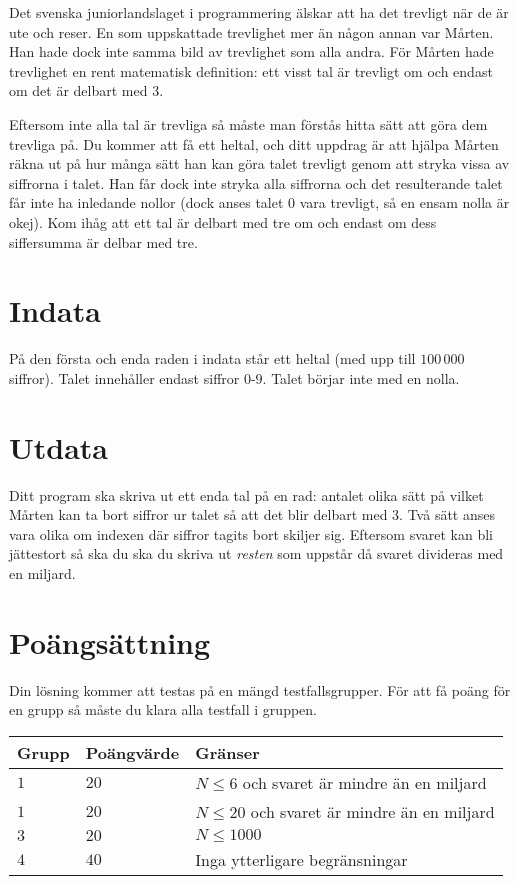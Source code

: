 Det svenska juniorlandslaget i programmering älskar att ha det trevligt när de
är ute och reser. En som uppskattade trevlighet mer än någon annan var Mårten.
Han hade dock inte samma bild av trevlighet som alla andra. För Mårten hade
trevlighet en rent matematisk definition: ett visst tal är trevligt om och
endast om det är delbart med 3.

Eftersom inte alla tal är trevliga så måste man förstås hitta sätt att göra dem
trevliga på. Du kommer att få ett heltal, och ditt uppdrag är att hjälpa Mårten
räkna ut på hur många sätt han kan göra talet trevligt genom att stryka vissa av
siffrorna i talet. Han får dock inte stryka alla siffrorna och det resulterande
talet får inte ha inledande nollor (dock anses talet $0$ vara trevligt, så en
ensam nolla är okej). Kom ihåg att ett tal är delbart med tre om
och endast om dess siffersumma är delbar med tre.

\section*{Indata}
På den första och enda raden i indata står ett heltal (med upp till $100\,000$
siffror). Talet innehåller endast siffror $0$-$9$. Talet börjar inte med en nolla.

\section*{Utdata}
Ditt program ska skriva ut ett enda tal på en rad: antalet olika sätt på vilket
Mårten kan ta bort siffror ur talet så att det blir delbart med $3$. Två sätt
anses vara olika om indexen där siffror tagits bort skiljer sig. Eftersom
svaret kan bli jättestort så ska du ska du skriva ut \emph{resten} som uppstår då svaret divideras med en miljard. 


\section*{Poängsättning}
Din lösning kommer att testas på en mängd testfallsgrupper.
För att få poäng för en grupp så måste du klara alla testfall i gruppen.

\noindent
\begin{tabular}{| l | l | l |}
  \hline
  Grupp & Poängvärde & Gränser \\ \hline
  $1$   & $20$       & $N \leq 6$ och svaret är mindre än en miljard \\ \hline
  $1$   & $20$       & $N \leq 20$ och svaret är mindre än en miljard \\ \hline
  $3$   & $20$       & $N \leq 1000$ \\ \hline
  $4$   & $40$       & Inga ytterligare begränsningar \\ \hline
\end{tabular}

